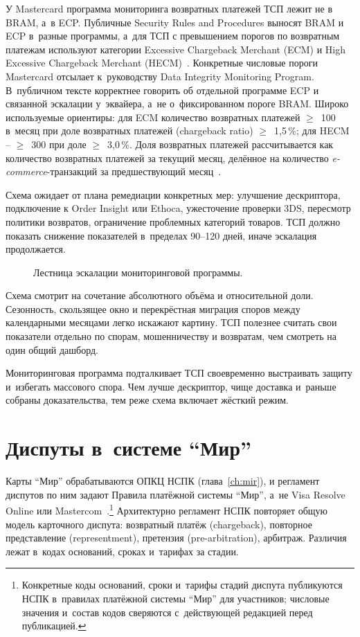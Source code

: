 У Mastercard программа мониторинга возвратных платежей ТСП лежит
не в BRAM, а~в ECP. Публичные Security Rules and Procedures
выносят BRAM и ECP в~разные программы, а~для ТСП с
превышением порогов по возвратным платежам используют категории
Excessive Chargeback Merchant (ECM) и High Excessive
Chargeback Merchant (HECM)~\cite{mc-compliance-programs,mc-spme-2025}.
Конкретные числовые пороги Mastercard отсылает к~руководству
Data Integrity Monitoring Program. В~публичном тексте
корректнее говорить об отдельной программе ECP и связанной
эскалации у~эквайера, а~не о~фиксированном пороге BRAM.
Широко используемые ориентиры: для ECM количество возвратных платежей
$\geq$~100 в~месяц при доле возвратных платежей (chargeback ratio) $\geq$~1,5\,\%;
для HECM -- $\geq$~300 при доле $\geq$~3,0\,\%.
Доля возвратных платежей рассчитывается как количество возвратных платежей за текущий
месяц, делённое на количество \textit{e-commerce}-транзакций за
предшествующий месяц~\cite{mc-compliance-programs}.

Схема ожидает от плана ремедиации конкретных мер:
улучшение дескриптора, подключение к Order Insight или Ethoca,
ужесточение проверки 3DS, пересмотр политики возвратов, ограничение
проблемных категорий товаров. ТСП должно показать снижение
показателей в~пределах 90--120 дней, иначе эскалация продолжается.

\begin{figure}[tbp]
  \centering
  \caption{Лестница эскалации мониторинговой программы.}\label{fig:monitoring-escalation}
\end{figure}

Схема смотрит на сочетание
абсолютного объёма и относительной доли. Сезонность, скользящее окно и
перекрёстная миграция споров между календарными месяцами легко искажают
картину. ТСП полезнее считать свои показатели отдельно по
спорам, мошенничеству и возвратам, чем смотреть на один общий дашборд.

Мониторинговая программа подталкивает ТСП своевременно
выстраивать защиту и~избегать массового спора.
Чем лучше дескриптор, чище доставка и~раньше собраны
доказательства, тем реже схема включает жёсткий режим.

\section{Диспуты в~системе \enquote{Мир}}\label{sec:disputes-mir}

Карты \enquote{Мир} обрабатываются ОПКЦ НСПК (глава~\ref{ch:mir}),
и регламент диспутов по ним задают Правила платёжной системы
\enquote{Мир}, а~не Visa Resolve Online или Mastercom~\cite{nspk-mir-rules}.\footnote{Конкретные
коды оснований, сроки и~тарифы стадий диспута публикуются НСПК
в~правилах платёжной системы \enquote{Мир} для участников;
числовые значения и~состав кодов сверяются с~действующей
редакцией перед публикацией.} Архитектурно регламент НСПК
повторяет общую модель карточного диспута: возвратный платёж
(chargeback), повторное представление (representment), претензия
(pre-arbitration), арбитраж. Различия лежат в~кодах оснований,
сроках и~тарифах за стадии.

